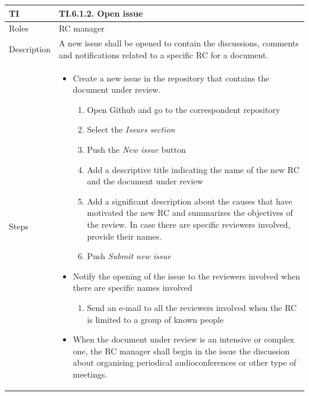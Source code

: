\documentclass{template/openetcs_article}
\begin{document}
\begin{flushleft}
\tablefirsthead{}
\tablehead{}
\tabletail{}
\tablelasttail{}
\begin{supertabular}{|m{2cm}|m{13cm}|}
\hline
{}
TI & 
TI.6.1.2. Open issue
\\\hline
Roles &
RC manager
\\\hline
Description &
A new issue shall be opened to contain the discussions, comments and notifications related to a specific RC for a document.
\\\hline
Steps &
\begin{itemize}
\item Create a new issue in the repository that contains the document under review. 
\begin{enumerate}
   \item Open Github and go to the correspondent repository
   \item Select the {\it Issues section}
   \item Push the {\it New issue} button
   \item Add a descriptive title indicating the name of the new RC and the document under review
   \item Add a significant description about the causes that have motivated the new RC and summarizes the objectives of the review. In case there are specific reviewers involved, provide their names.
   	\item Push {\it Submit new issue}
\end{enumerate}
\item Notify the opening of the issue to the reviewers involved when there are specific names involved
\begin{enumerate}
	\item Send an e-mail to all the reviewers involved when the RC is limited to a group of known people 
\end{enumerate}
\item When the document under review is an intensive or complex one, the RC manager shall begin in the issue the discussion about organising periodical audioconferences or other type of meetings. 
\end{itemize}
\\\hline
\end{supertabular}
\end{flushleft}
\end{document}
